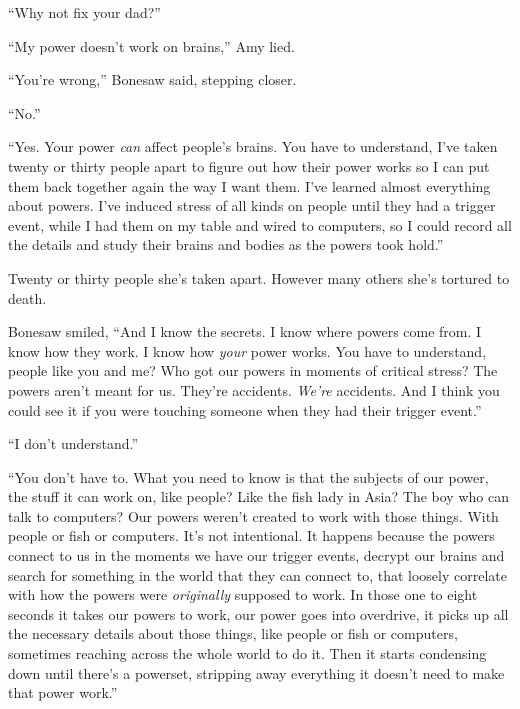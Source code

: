 ``Why not fix your dad?''



``My power doesn't work on brains,'' Amy lied.



``You're wrong,'' Bonesaw said, stepping closer.



``No.''



``Yes.  Your power \emph{can} affect people's brains.  You have to understand, I've taken twenty or thirty people apart to figure out how their power works so I can put them back together again the way I want them.  I've learned almost everything about powers.  I've induced stress of all kinds on people until they had a trigger event, while I had them on my table and wired to computers, so I could record all the details and study their brains and bodies as the powers took hold.''



Twenty or thirty people she's taken apart.  However many others she's tortured to death.



Bonesaw smiled, ``And I know the secrets.  I know where powers come from.  I know how they work.  I know how \emph{your} power works.  You have to understand, people like you and me?  Who got our powers in moments of critical stress?  The powers aren't meant for us.  They're accidents.  \emph{We're} accidents.  And I think you could see it if you were touching someone when they had their trigger event.''



``I don't understand.''



``You don't have to.  What you need to know is that the subjects of our power, the stuff it can work on, like people?  Like the fish lady in Asia?  The boy who can talk to computers?  Our powers weren't created to work with those things.  With people or fish or computers.  It's not intentional.  It happens because the powers connect to us in the moments we have our trigger events, decrypt our brains and search for something in the world that they can connect to, that loosely correlate with how the powers were \emph{originally} supposed to work.  In those one to eight seconds it takes our powers to work, our power goes into overdrive, it picks up all the necessary details about those things, like people or fish or computers, sometimes reaching across the whole world to do it.  Then it starts condensing down until there's a powerset, stripping away everything it doesn't need to make that power work.''



